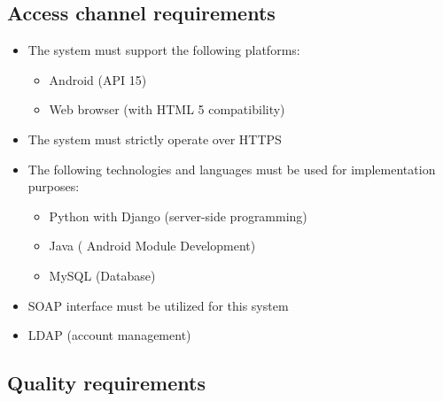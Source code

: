 \documentclass[12pt]{article}
\begin{document}
		\vspace{0.2in}
		
		\subsection{Access channel requirements}
			\vspace{0.2in}
			\begin{itemize}
						\item The system must support the following platforms: 
							\begin{itemize}
								\item Android (API 15)
								\item Web browser (with HTML 5 compatibility)
							\end{itemize}
							
						\item The system must strictly operate over HTTPS
						\item The following technologies and languages must be used for implementation purposes:
							\begin{itemize}
								\item Python with Django (server-side programming)
								\item Java ( Android Module Development)
								\item MySQL (Database)
							\end{itemize}
							\item SOAP interface must be utilized for this system
							\item LDAP (account management)
			\end{itemize}
			
		
		\subsection{Quality requirements}
		
\end{document}
